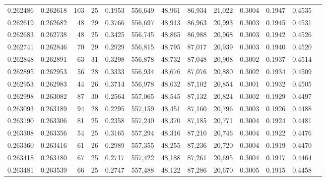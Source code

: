 \begin{tabular}{rrrrrrrrrrrrr}
0.262486 & 0.262618 & 103 &  25 &                                     0.1953 & 556,649 &  48,961 &  86,934 &  21,022 & 0.3004 & 0.1947 & 0.4535 \\
0.262619 & 0.262682 &  48 &  29 &                                     0.3766 & 556,697 &  48,913 &  86,963 &  20,993 & 0.3003 & 0.1945 & 0.4531 \\
0.262683 & 0.262738 &  48 &  25 &                                     0.3425 & 556,745 &  48,865 &  86,988 &  20,968 & 0.3003 & 0.1942 & 0.4526 \\
0.262741 & 0.262846 &  70 &  29 &                                     0.2929 & 556,815 &  48,795 &  87,017 &  20,939 & 0.3003 & 0.1940 & 0.4520 \\
0.262848 & 0.262891 &  63 &  31 &                                     0.3298 & 556,878 &  48,732 &  87,048 &  20,908 & 0.3002 & 0.1937 & 0.4514 \\
0.262895 & 0.262953 &  56 &  28 &                                     0.3333 & 556,934 &  48,676 &  87,076 &  20,880 & 0.3002 & 0.1934 & 0.4509 \\
0.262953 & 0.262983 &  44 &  26 &                                     0.3714 & 556,978 &  48,632 &  87,102 &  20,854 & 0.3001 & 0.1932 & 0.4505 \\
0.262998 & 0.263082 &  87 &  30 &                                     0.2564 & 557,065 &  48,545 &  87,132 &  20,824 & 0.3002 & 0.1929 & 0.4497 \\
0.263093 & 0.263189 &  94 &  28 &                                     0.2295 & 557,159 &  48,451 &  87,160 &  20,796 & 0.3003 & 0.1926 & 0.4488 \\
0.263190 & 0.263306 &  81 &  25 &                                     0.2358 & 557,240 &  48,370 &  87,185 &  20,771 & 0.3004 & 0.1924 & 0.4481 \\
0.263308 & 0.263356 &  54 &  25 &                                     0.3165 & 557,294 &  48,316 &  87,210 &  20,746 & 0.3004 & 0.1922 & 0.4476 \\
0.263360 & 0.263416 &  61 &  26 &                                     0.2989 & 557,355 &  48,255 &  87,236 &  20,720 & 0.3004 & 0.1919 & 0.4470 \\
0.263418 & 0.263480 &  67 &  25 &                                     0.2717 & 557,422 &  48,188 &  87,261 &  20,695 & 0.3004 & 0.1917 & 0.4464 \\
0.263481 & 0.263539 &  66 &  25 &                                     0.2747 & 557,488 &  48,122 &  87,286 &  20,670 & 0.3005 & 0.1915 & 0.4458 \\

\end{tabular}
